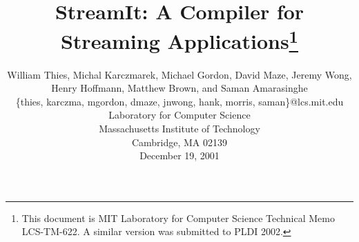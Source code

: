 \documentclass{sig-alternate}
\begin{document}

\title{StreamIt: A Compiler for Streaming Applications\thanks{This document is MIT Laboratory for Computer Science Technical Memo LCS-TM-622.  A similar version was submitted to PLDI 2002.}}


\author{
\alignauthor \vspace{-18pt}
William Thies, 
Michal Karczmarek, 
Michael Gordon, 
David Maze, 
Jeremy Wong,
Henry Hoffmann, 
Matthew Brown, 
and Saman Amarasinghe\\
	\vspace{8pt}
	\{thies, karczma, mgordon, dmaze, jnwong, hank, morris, saman\}@lcs.mit.edu \\
	\vspace{8pt}
	Laboratory for Computer Science \\
	Massachusetts Institute of Technology \\
	Cambridge, MA  02139 \\
	\vspace{8pt}
        December 19, 2001}
	

\newcommand{\ma}[2]{max_{#1 \rightarrow #2}}
\newcommand{\sdep}[0]{\textsc{sdep}}
\newcommand{\loopdep}[0]{\textsc{loopdep}}
\newcommand{\mi}[2]{\sdep_{#2 \small{\rightarrow} #1}}
\newcommand{\floor}[2]{\left\lfloor\frac{#1}{#2}\right\rfloor}
\newcommand{\ceil}[2]{\left\lceil\frac{#1}{#2}\right\rceil}
\newcommand{\ra}[0]{\rightarrow}
\newcommand{\la}[0]{\lambda}

\def\fn#1{\mathop{\mbox{\it #1}}}
\def\fun#1#2{\ensuremath{\mathop{\mbox{\it #1}}(#2)}} %

\newtheorem{definition}{Definition}
\newtheorem{theorem}{Theorem}

\maketitle

\begin{abstract}

\end{abstract}











\end{document}
